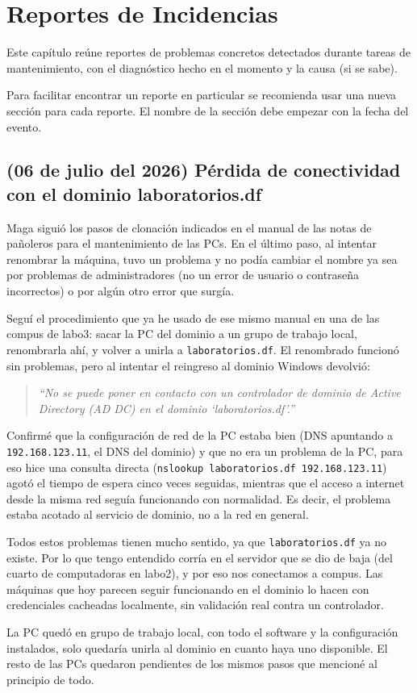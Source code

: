 \chapter[Reportes de Incidencias]{Reportes de Incidencias}
\label{cp:reportes-incidencias}

Este capítulo reúne reportes de problemas concretos detectados durante tareas de mantenimiento, con el diagnóstico hecho en el momento y la causa (si se sabe).

Para facilitar encontrar un reporte en particular se recomienda usar una nueva sección para cada reporte. El nombre de la sección debe empezar con la fecha del evento.

\section{(06 de julio del 2026) Pérdida de conectividad con el dominio laboratorios.df}
\label{sc:ri:01-conectividad}

Maga siguió los pasos de clonación indicados en el manual de las notas de pañoleros para el mantenimiento de las PCs. En el último paso, al intentar renombrar la máquina, tuvo un problema y no podía cambiar el nombre ya sea por problemas de administradores (no un error de usuario o contraseña incorrectos) o por algún otro error que surgía.

Seguí el procedimiento que ya he usado de ese mismo manual en una de las compus de labo3: sacar la PC del dominio a un grupo de trabajo local, renombrarla ahí, y volver a unirla a \texttt{laboratorios.df}. El renombrado funcionó sin problemas, pero al intentar el reingreso al dominio Windows devolvió:

\begin{quote}
\textit{``No se puede poner en contacto con un controlador de dominio de Active Directory (AD DC) en el dominio `laboratorios.df'.''}
\end{quote}

Confirmé que la configuración de red de la PC estaba bien (DNS apuntando a \texttt{192.168.123.11}, el DNS del dominio) y que no era un problema de la PC, para eso hice una consulta directa (\texttt{nslookup laboratorios.df 192.168.123.11}) agotó el tiempo de espera cinco veces seguidas, mientras que el acceso a internet desde la misma red seguía funcionando con normalidad. Es decir, el problema estaba acotado al servicio de dominio, no a la red en general.

Todos estos problemas tienen mucho sentido, ya que \texttt{laboratorios.df} ya no existe. Por lo que tengo entendido corría en el servidor que se dio de baja (del cuarto de computadoras en labo2), y por eso nos conectamos a compus. Las máquinas que hoy parecen seguir funcionando en el dominio lo hacen con credenciales cacheadas localmente, sin validación real contra un controlador.

La PC quedó en grupo de trabajo local, con todo el software y la configuración instalados, solo quedaría unirla al dominio en cuanto haya uno disponible. El resto de las PCs quedaron pendientes de los mismos pasos que mencioné al principio de todo.
